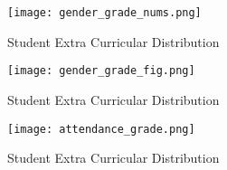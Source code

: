 \begin{figure}
	\centering %
	\texttt{[image: gender\_grade\_nums.png]}
	\caption{Student Extra Curricular Distribution \label{fig:gender_grade_nums}}
\end{figure}

\begin{figure}
	\centering %
	\texttt{[image: gender\_grade\_fig.png]}
	\caption{Student Extra Curricular Distribution \label{fig:gender_grade_fig}}
\end{figure}

\begin{figure}
	\centering %
	\texttt{[image: attendance\_grade.png]}
	\caption{Student Extra Curricular Distribution \label{fig:attendance_grade}}
\end{figure}
